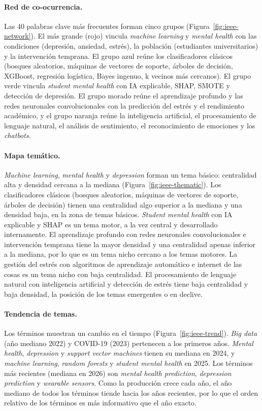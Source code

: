 \documentclass[11pt,a4paper]{article}
\begin{document}
\paragraph{Red de co-ocurrencia.} Las 40 palabras clave más frecuentes forman cinco grupos (Figura~\ref{fig:ieee-network}). El más grande (rojo) vincula \emph{machine learning} y \emph{mental health} con las condiciones (depresión, ansiedad, estrés), la población (estudiantes universitarios) y la intervención temprana. El grupo azul reúne los clasificadores clásicos (bosques aleatorios, máquinas de vectores de soporte, árboles de decisión, XGBoost, regresión logística, Bayes ingenuo, k vecinos más cercanos). El grupo verde vincula \emph{student mental health} con IA explicable, SHAP, SMOTE y detección de depresión. El grupo morado reúne el aprendizaje profundo y las redes neuronales convolucionales con la predicción del estrés y el rendimiento académico, y el grupo naranja reúne la inteligencia artificial, el procesamiento de lenguaje natural, el análisis de sentimiento, el reconocimiento de emociones y los \emph{chatbots}.

\paragraph{Mapa temático.} \emph{Machine learning}, \emph{mental health} y \emph{depression} forman un tema básico: centralidad alta y densidad cercana a la mediana (Figura~\ref{fig:ieee-thematic}). Los clasificadores clásicos (bosques aleatorios, máquinas de vectores de soporte, árboles de decisión) tienen una centralidad algo superior a la mediana y una densidad baja, en la zona de temas básicos. \emph{Student mental health} con IA explicable y SHAP es un tema motor, a la vez central y desarrollado internamente. El aprendizaje profundo con redes neuronales convolucionales e intervención temprana tiene la mayor densidad y una centralidad apenas inferior a la mediana, por lo que es un tema nicho cercano a los temas motores. La gestión del estrés con algoritmos de aprendizaje automático e internet de las cosas es un tema nicho con baja centralidad. El procesamiento de lenguaje natural con inteligencia artificial y detección de estrés tiene baja centralidad y baja densidad, la posición de los temas emergentes o en declive.

\paragraph{Tendencia de temas.} Los términos muestran un cambio en el tiempo (Figura~\ref{fig:ieee-trend}). \emph{Big data} (año mediano 2022) y COVID-19 (2023) pertenecen a los primeros años. \emph{Mental health}, \emph{depression} y \emph{support vector machines} tienen su mediana en 2024, y \emph{machine learning}, \emph{random forests} y \emph{student mental health} en 2025. Los términos más recientes (mediana en 2026) son \emph{mental health prediction}, \emph{depression prediction} y \emph{wearable sensors}. Como la producción crece cada año, el año mediano de todos los términos tiende hacia los años recientes, por lo que el orden relativo de los términos es más informativo que el año exacto.
\end{document}

